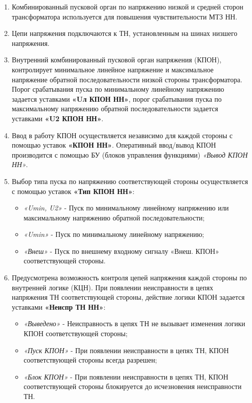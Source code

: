 \color{black}

\begin{enumerate}[label=\arabic{section}.\arabic{subsection}.\arabic*,  align=left, labelsep=4pt, leftmargin=0pt, itemindent=57pt]

\item
Комбинированный пусковой орган по напряжению низкой и средней сторон трансформатора
используется для повышения чувствительности МТЗ НН.   

\item
Цепи напряжения подключаются к ТН, установленным на шинах низшего напряжения.

\item
Внутренний комбинированный пусковой орган напряжения (КПОН), контролирует минимальное
линейное напряжение и максимальное напряжение обратной последовательности низкой стороны
трансформатора. Порог срабатывания пуска по минимальному линейному напряжению задается
уставками \textbf{«Uл КПОН НН»}, порог срабатывания пуска по максимальному напряжению
обратной последовательности задается уставками \textbf{«U2 КПОН НН»}. 

\item
Ввод в работу КПОН осуществляется независимо для каждой стороны с помощью уставок \textbf{«КПОН
НН»}. Оперативный ввод/вывод КПОН производится с помощью БУ (блоков управления функциями)
\textit{«Вывод КПОН НН»}.

\item
Выбор типа пуска по напряжению соответствующей стороны осуществляется с помощью уставок \textbf{«Тип КПОН НН»}: 
\begin{itemize}
\item \textit{«Umin, U2»} - Пуск по минимальному линейному напряжению или максимальному напряжению обратной последовательности;
\item \textit{«Umin»} - Пуск по минимальному линейному напряжению;
\item \textit{«Внеш»} - Пуск по внешнему входному сигналу «Внеш. КПОН» соответствующей стороны.
\end{itemize}

\item
Предусмотрена возможность контроля цепей напряжения каждой стороны по внутренней логике
(КЦН). При появлении неисправности в цепях напряжения ТН соответствующей стороны, действие
логики КПОН задается уставками \textbf{«Неиспр ТН НН»}:
\begin{itemize}
\item \textit{«Выведено»} - Неисправность в цепях ТН не вызывает изменения логики КПОН соответствующей стороны;
\item \textit{«Пуск КПОН»} - При появлении неисправности в цепях ТН, КПОН соответствующей стороны всегда разрешен;
\item \textit{«Блок КПОН»} - При появлении неисправности в цепях ТН, КПОН соответствующей стороны блокируется до исчезновения неисправности ТН.
\end{itemize}


\end{enumerate}
